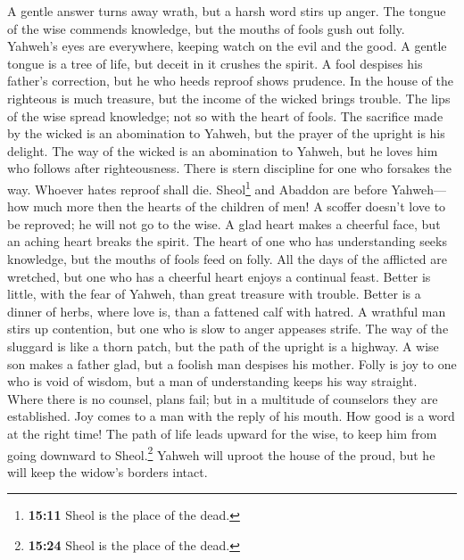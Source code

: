  A gentle answer turns away wrath, but a harsh word stirs
up anger.  The tongue of the wise commends knowledge, but
the mouths of fools gush out folly.  Yahweh's eyes are
everywhere, keeping watch on the evil and the good.  A
gentle tongue is a tree of life, but deceit in it crushes the spirit.
 A fool despises his father's correction, but he who heeds
reproof shows prudence.  In the house of the righteous is
much treasure, but the income of the wicked brings trouble.
 The lips of the wise spread knowledge; not so with the
heart of fools.  The sacrifice made by the wicked is an
abomination to Yahweh, but the prayer of the upright is his delight.
 The way of the wicked is an abomination to Yahweh, but he
loves him who follows after righteousness.  There is
stern discipline for one who forsakes the way. Whoever hates reproof
shall die.  Sheol\footnote{\textbf{15:11} Sheol is the
  place of the dead.} and Abaddon are before Yahweh--- how much more
then the hearts of the children of men!  A scoffer
doesn't love to be reproved; he will not go to the wise. 
A glad heart makes a cheerful face, but an aching heart breaks the
spirit.  The heart of one who has understanding seeks
knowledge, but the mouths of fools feed on folly.  All
the days of the afflicted are wretched, but one who has a cheerful heart
enjoys a continual feast.  Better is little, with the
fear of Yahweh, than great treasure with trouble.  Better
is a dinner of herbs, where love is, than a fattened calf with hatred.
 A wrathful man stirs up contention, but one who is slow
to anger appeases strife.  The way of the sluggard is
like a thorn patch, but the path of the upright is a highway.
 A wise son makes a father glad, but a foolish man
despises his mother.  Folly is joy to one who is void of
wisdom, but a man of understanding keeps his way straight.
 Where there is no counsel, plans fail; but in a
multitude of counselors they are established.  Joy comes
to a man with the reply of his mouth. How good is a word at the right
time!  The path of life leads upward for the wise, to
keep him from going downward to Sheol.\footnote{\textbf{15:24} Sheol is
  the place of the dead.}  Yahweh will uproot the house
of the proud, but he will keep the widow's borders intact.
